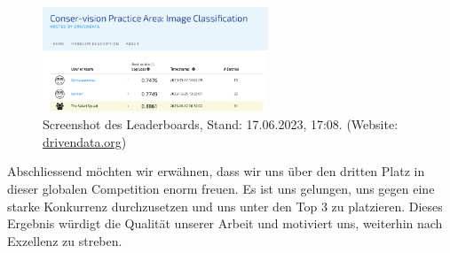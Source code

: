 \documentclass{article}
\begin{document}
\begin{figure}[!h]
    \centering
    \includegraphics[width=0.6\textwidth]{plots/Leaderboard_Competition.png}
    \caption{\label{fig:leaderboard_competition}Screenshot des Leaderboards, Stand: 17.06.2023, 17:08. (Website: \href{https://www.drivendata.org/competitions/87/competition-image-classification-wildlife-conservation/leaderboard/?page=1}{drivendata.org})}
\end{figure}
Abschliessend möchten wir erwähnen, dass wir uns über den dritten Platz in dieser globalen Competition enorm freuen. Es ist uns gelungen, uns gegen eine starke Konkurrenz durchzusetzen und uns unter den Top 3 zu platzieren. Dieses Ergebnis würdigt die Qualität unserer Arbeit und motiviert uns, weiterhin nach Exzellenz zu streben.

\newpage



\end{document}
